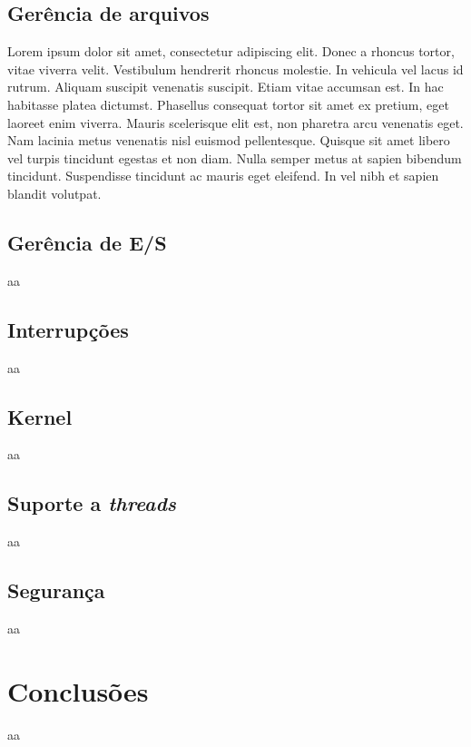 \documentclass[journal]{IEEEtran}
\begin{document}
\subsection{Gerência de arquivos}
	Lorem ipsum dolor sit amet, consectetur adipiscing elit. Donec a rhoncus tortor, vitae viverra velit. Vestibulum hendrerit rhoncus molestie. In vehicula vel lacus id rutrum. Aliquam suscipit venenatis suscipit. Etiam vitae accumsan est. In hac habitasse platea dictumst. Phasellus consequat tortor sit amet ex pretium, eget laoreet enim viverra. Mauris scelerisque elit est, non pharetra arcu venenatis eget. Nam lacinia metus venenatis nisl euismod pellentesque. Quisque sit amet libero vel turpis tincidunt egestas et non diam. Nulla semper metus at sapien bibendum tincidunt. Suspendisse tincidunt ac mauris eget eleifend. In vel nibh et sapien blandit volutpat. 
	
\subsection{Gerência de E/S}
	aa
\subsection{Interrupções}
	aa
\subsection{Kernel}
	aa
\subsection{Suporte a \emph{threads}}
	aa
\subsection{Segurança}
	aa
\section{Conclusões}
	aa



	

\end{document}
